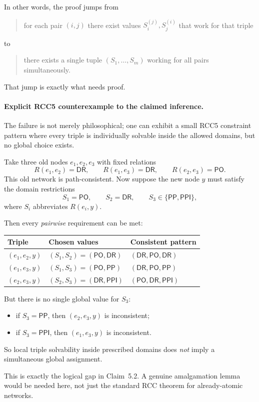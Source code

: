 \documentclass[11pt]{article}
\newcommand{\role}[1]{\ensuremath{\mathsf{#1}}}
\newcommand{\PP}{\role{PP}}
\newcommand{\PPI}{\role{PPI}}
\newcommand{\DR}{\role{DR}}
\newcommand{\PO}{\role{PO}}
\begin{document}
In other words, the proof jumps from
\begin{quote}
for each pair $(i,j)$ there exist values $S_i^{(j)},S_j^{(i)}$ that work for that triple
\end{quote}
to
\begin{quote}
there exists a single tuple $(S_1,\dots,S_m)$ working for all pairs simultaneously.
\end{quote}
That jump is exactly what needs proof.

\paragraph{Explicit RCC5 counterexample to the claimed inference.}
The failure is not merely philosophical; one can exhibit a small RCC5 constraint pattern where every triple is individually solvable inside the allowed domains, but no global choice exists.

Take three old nodes $e_1,e_2,e_3$ with fixed relations
\[
R(e_1,e_2)=\DR, \qquad R(e_1,e_3)=\DR, \qquad R(e_2,e_3)=\PO.
\]
This old network is path-consistent. Now suppose the new node $y$ must satisfy the domain restrictions
\[
S_1 = \PO, \qquad S_2 = \DR, \qquad S_3 \in \{\PP,\PPI\},
\]
where $S_i$ abbreviates $R(e_i,y)$.

Then every \emph{pairwise} requirement can be met:
\begin{center}
\renewcommand{\arraystretch}{1.2}
\begin{tabular}{lll}
\toprule
Triple & Chosen values & Consistent pattern \\
\midrule
$(e_1,e_2,y)$ & $(S_1,S_2)=(\PO,\DR)$ & $(\DR,\PO,\DR)$ \\
$(e_1,e_3,y)$ & $(S_1,S_3)=(\PO,\PP)$ & $(\DR,\PO,\PP)$ \\
$(e_2,e_3,y)$ & $(S_2,S_3)=(\DR,\PPI)$ & $(\PO,\DR,\PPI)$ \\
\bottomrule
\end{tabular}
\end{center}
But there is no single global value for $S_3$:
\begin{itemize}
    \item if $S_3=\PP$, then $(e_2,e_3,y)$ is inconsistent;
    \item if $S_3=\PPI$, then $(e_1,e_3,y)$ is inconsistent.
\end{itemize}
So local triple solvability inside prescribed domains does \emph{not} imply a simultaneous global assignment.

This is exactly the logical gap in Claim~5.2. A genuine amalgamation lemma would be needed here, not just the standard RCC theorem for already-atomic networks.
\end{document}
